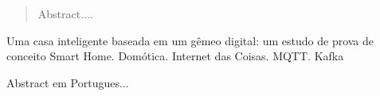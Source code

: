 

\begin{abstract}

Abstract....
\end{abstract}

\begin{englishabstract}
{Uma casa inteligente baseada em um gêmeo digital: um estudo de prova de conceito}
{Smart Home. Domótica. Internet das Coisas. MQTT. Kafka}

Abstract em Portugues...


\end{englishabstract}



